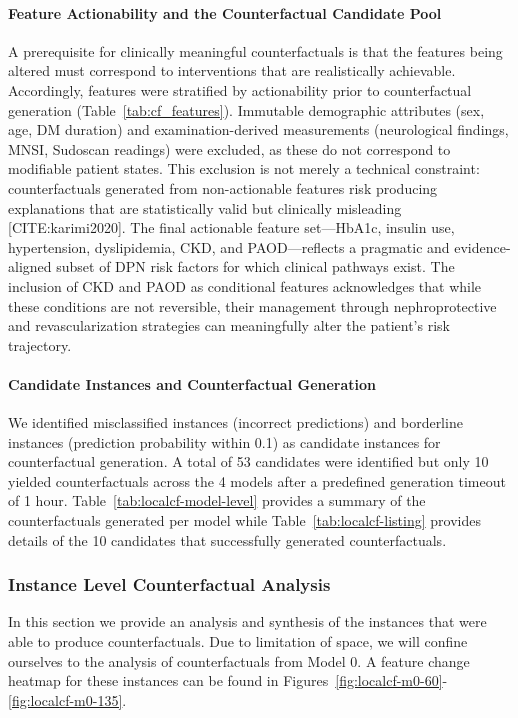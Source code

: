 \documentclass[pdflatex,sn-vancouver-num]{sn-jnl}
\begin{document}
\paragraph{Feature Actionability and the Counterfactual Candidate Pool}
A prerequisite for clinically meaningful counterfactuals is that the features being altered must correspond to interventions that are realistically achievable. Accordingly, features were stratified by actionability prior to counterfactual generation (Table~\ref{tab:cf_features}). Immutable demographic attributes (sex, age, DM duration) and examination-derived measurements (neurological findings, MNSI, Sudoscan readings) were excluded, as these do not correspond to modifiable patient states. This exclusion is not merely a technical constraint: counterfactuals generated from non-actionable features risk producing explanations that are statistically valid but clinically misleading [CITE:karimi2020]. The final actionable feature set—HbA1c, insulin use, hypertension, dyslipidemia, CKD, and PAOD—reflects a pragmatic and evidence-aligned subset of DPN risk factors for which clinical pathways exist. The inclusion of CKD and PAOD as conditional features acknowledges that while these conditions are not reversible, their management through nephroprotective and revascularization strategies can meaningfully alter the patient's risk trajectory.

\paragraph{Candidate Instances and Counterfactual Generation}
We identified misclassified instances (incorrect predictions) and borderline instances (prediction probability within 0.1) as candidate instances for counterfactual generation. A total of 53 candidates were identified but only 10 yielded counterfactuals across the 4 models after a predefined generation timeout of 1 hour. Table~\ref{tab:localcf-model-level} provides a summary of the counterfactuals generated per model while Table~\ref{tab:localcf-listing} provides details of the 10 candidates that successfully generated counterfactuals.

\subsubsection{Instance Level Counterfactual Analysis}
In this section we provide an analysis and synthesis of the instances that were able to produce counterfactuals. Due to limitation of space, we will confine ourselves to the analysis of counterfactuals from Model 0. A feature change heatmap for these instances can be found in Figures~\ref{fig:localcf-m0-60}-\ref{fig:localcf-m0-135}. 
\end{document}
